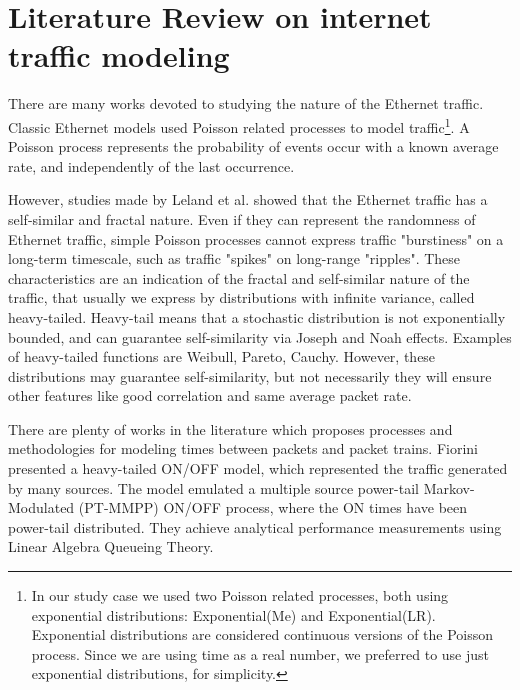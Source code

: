 \section{Literature Review on internet traffic modeling}


There are many works devoted to studying the nature of the Ethernet traffic\cite{selfsimilar-ethernet}. Classic Ethernet models used Poisson related processes to model traffic\footnote{In our study case we used two Poisson related processes, both using exponential distributions: Exponential(Me) and Exponential(LR). Exponential distributions are considered continuous versions of the Poisson process.  Since we are using time as a real number, we preferred to use just exponential distributions, for simplicity.}. A Poisson process represents the probability of events occur with a known average rate, and independently of the last occurrence\cite{book-poisson}. 

However, studies made by Leland et al.  showed that the Ethernet traffic has a self-similar and fractal nature. Even if they can represent the randomness of   Ethernet traffic, simple Poisson processes cannot express traffic "burstiness" on a long-term timescale, such as traffic "spikes" on long-range "ripples". These characteristics are an indication of the fractal and self-similar nature of the traffic, that usually we express by distributions with infinite variance, called heavy-tailed. Heavy-tail means that a stochastic distribution is not exponentially bounded\cite{sourcesonoff-paper}, and can guarantee self-similarity via Joseph and Noah effects\cite{selfsimilar-highvariability}. Examples of heavy-tailed functions are Weibull, Pareto, Cauchy. However, these distributions may guarantee self-similarity, but not necessarily they will ensure other features like good correlation and same average packet rate\cite{validate-trafficgen}. 

There are plenty of works in the literature which proposes processes and methodologies for modeling times between packets and packet trains\cite{selfsimilar-ethernet}\cite{analysis-self-similar}\cite{stochastic-selfsimilar}\cite{selfsimilar-highvariability}\cite{multi-player-online-game-self-similarity}\cite{estimation-renewal-function-ethernet-traffic}\cite{modelling-of-self-similar}\cite{empirical-interarrival-study}\cite{modeling-concurrent-heavy-tailed}\cite{optimal-scheduling-of-heavy-tailed-traffic}\cite{modelling-of-self-similar}. Fiorini\cite{modeling-concurrent-heavy-tailed}  presented a heavy-tailed ON/OFF model, which represented the traffic generated by many sources. The model emulated a multiple source power-tail Markov-Modulated (\acrfull{PT-MMPP}) ON/OFF process, where the ON times have been power-tail distributed. They achieve analytical performance measurements using Linear Algebra Queueing Theory. 

